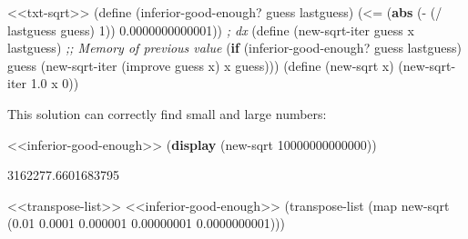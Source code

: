 \documentclass[
]{article}
\newenvironment{Shaded}{}{}
\newcommand{\CommentTok}[1]{\textcolor[rgb]{0.38,0.63,0.69}{\textit{#1}}}
\newcommand{\DecValTok}[1]{\textcolor[rgb]{0.25,0.63,0.44}{#1}}
\newcommand{\ExtensionTok}[1]{#1}
\newcommand{\FloatTok}[1]{\textcolor[rgb]{0.25,0.63,0.44}{#1}}
\newcommand{\FunctionTok}[1]{\textcolor[rgb]{0.02,0.16,0.49}{#1}}
\newcommand{\KeywordTok}[1]{\textcolor[rgb]{0.00,0.44,0.13}{\textbf{#1}}}
\newcommand{\NormalTok}[1]{#1}
\newcommand{\OperatorTok}[1]{\textcolor[rgb]{0.40,0.40,0.40}{#1}}
\begin{document}
\hypertarget{inferior-good-enough}{%
\label{inferior-good-enough}}%
\begin{Shaded}
\begin{Highlighting}[]
\NormalTok{\textless{}\textless{}txt{-}sqrt\textgreater{}\textgreater{}}
\NormalTok{(}\ExtensionTok{define}\FunctionTok{ }\NormalTok{(inferior{-}good{-}enough? guess lastguess)}
\NormalTok{  (}\OperatorTok{\textless{}=}
\NormalTok{   (}\KeywordTok{abs}\NormalTok{ (}\OperatorTok{{-}}
\NormalTok{         (}\OperatorTok{/}\NormalTok{ lastguess guess)}
         \DecValTok{1}\NormalTok{))}
   \FloatTok{0.0000000000001}\NormalTok{)) }\CommentTok{; dx}
\NormalTok{(}\ExtensionTok{define}\FunctionTok{ }\NormalTok{(new{-}sqrt{-}iter guess x lastguess) }\CommentTok{;; Memory of previous value}
\NormalTok{  (}\KeywordTok{if}\NormalTok{ (inferior{-}good{-}enough? guess lastguess)}
\NormalTok{      guess}
\NormalTok{      (new{-}sqrt{-}iter (improve guess x) x guess)))}
\NormalTok{(}\ExtensionTok{define}\FunctionTok{ }\NormalTok{(new{-}sqrt x)}
\NormalTok{  (new{-}sqrt{-}iter }\FloatTok{1.0}\NormalTok{ x }\DecValTok{0}\NormalTok{))}
\end{Highlighting}
\end{Shaded}

This solution can correctly find small and large numbers:

\begin{Shaded}
\begin{Highlighting}[]
\NormalTok{\textless{}\textless{}inferior{-}good{-}enough\textgreater{}\textgreater{}}
\NormalTok{(}\KeywordTok{display}\NormalTok{ (new{-}sqrt }\DecValTok{10000000000000}\NormalTok{))}
\end{Highlighting}
\end{Shaded}

\begin{Shaded}
\begin{Highlighting}[]
\FloatTok{3162277.6601683795}
\end{Highlighting}
\end{Shaded}

\hypertarget{EX1-7-t2}{%
\label{EX1-7-t2}}%
\begin{Shaded}
\begin{Highlighting}[]
\NormalTok{\textless{}\textless{}transpose{-}list\textgreater{}\textgreater{}}
\NormalTok{\textless{}\textless{}inferior{-}good{-}enough\textgreater{}\textgreater{}}
\NormalTok{(transpose{-}list (map new{-}sqrt \textquotesingle{}(}\FloatTok{0.01} \FloatTok{0.0001} \FloatTok{0.000001} \FloatTok{0.00000001} \FloatTok{0.0000000001}\NormalTok{)))}
\end{Highlighting}
\end{Shaded}
\end{document}
